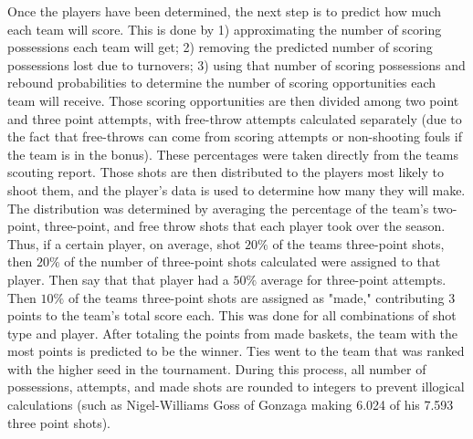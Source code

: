 Once the players have been determined, the next step is to predict how much each team will score.  
This is done by 1) approximating the number of scoring possessions each team will get; 2) removing the predicted number of scoring possessions lost due to turnovers; 3) using that number of scoring possessions and rebound probabilities to determine the number of scoring opportunities each team will receive.  
Those scoring opportunities are then divided among two point and three point attempts, with free-throw attempts calculated separately (due to the fact that free-throws can come from scoring attempts or non-shooting fouls if the team is in the bonus).  
These percentages were taken directly from the teams scouting report.  
Those shots are then distributed to the players most likely to shoot them, and the player's data is used to determine how many they will make.  
The distribution was determined by averaging the percentage of the team's two-point, three-point, and free throw shots that each player took over the season.  
Thus, if a certain player, on average, shot $20\%$ of the teams three-point shots, then $20\%$ of the number of three-point shots calculated were assigned to that player.  
Then say that that player had a $50\%$ average for three-point attempts.  
Then $10\%$ of the teams three-point shots are assigned as "made," contributing $3$ points to the team's total score each.  
This was done for all combinations of shot type and player.  
After totaling the points from made baskets, the team with the most points is predicted to be the winner.  
Ties went to the team that was ranked with the higher seed in the tournament.  
During this process, all number of possessions, attempts, and made shots are rounded to integers to prevent illogical calculations (such as Nigel-Williams Goss of Gonzaga making 6.024 of his 7.593 three point shots).  